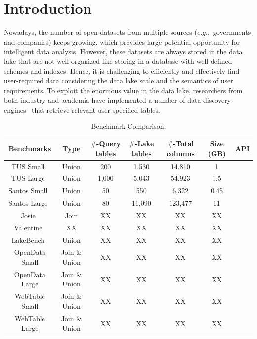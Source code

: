 
\section{Introduction}
 
Nowadays, the number of open datasets from multiple sources ($e.g.,$ governments and companies) keeps growing, which provides large potential opportunity for intelligent data analysis. However, these datasets are always stored in the data lake that are not well-organized like storing in a database with well-defined schemes and indexes. Hence, it is challenging to efficiently and effectively find user-required data considering the data lake scale and the semantics of user requirements.  
To exploit the enormous value in the data lake, researchers from both industry and academia have implemented a number of data discovery engines~\cite{} that retrieve relevant user-specified tables. 



\begin{table}[t]
	\centering
	\caption{Benchmark Comparison.}
	\begin{tabular}{|c|c|c|c|c|c|c|}
		\hline
		\centering
		Benchmarks & Type & $\#$-Query tables & $\#$-Lake tables & $\#$-Total columns & Size (GB) &  API \\
		\hline  
		TUS Small~\cite{TUS}& Union  & 200 & 1,530 & 14,810 & 1 & \XSolidBrush \\
		\hline
		TUS Large~\cite{TUS}& Union  & 1,000 & 5,043 & 54,923 & 1.5 & \XSolidBrush \\
		\hline
		Santos Small~\cite{Santos}& Union  & 50 & 550 & 6,322 & 0.45 & \XSolidBrush \\
		\hline
		Santos Large~\cite{Santos}& Union  & 80 & 11,090 & 123,477 & 11 & \XSolidBrush  \\
		\hline
		Josie~\cite{Josie}& Join  & XX & XX  & XX  & XX &  \XSolidBrush \\
		\hline
		Valentine~\cite{valentine}& XX  & XX & XX  & XX  & XX &  \XSolidBrush \\
		\hline
		LakeBench~\cite{arxiv}& Union & XX & XX  & XX  & XX &  \XSolidBrush \\
		\hline
		\rowcolor{gray!40}
		OpenData Small& Join \& Union  & XX & XX  & XX  & XX & \Checkmark  \\
		\hline
		\rowcolor{gray!40}
		OpenData Large& Join \& Union  & XX & XX  & XX  & XX & \Checkmark  \\
		\hline
		\rowcolor{gray!40}
		WebTable Small& Join \& Union  & XX & XX  & XX  & XX & \Checkmark\\
		\hline
		\rowcolor{gray!40}
		WebTable Large& Join \& Union  & XX & XX  & XX  & XX &\Checkmark \\
		\hline
	\end{tabular}
	\label{Table:benchmarks}

\end{table}

